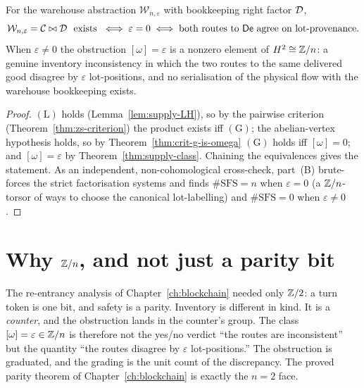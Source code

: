 \begin{corollary}
\label{cor:supply-dichotomy}
For the warehouse abstraction $\mathcal W_{n,\varepsilon}$ with bookkeeping right
factor $\mathcal{D}$,
\[
   \mathcal W_{n,\varepsilon}=\C\bowtie\D \ \text{ exists }
   \iff \varepsilon=0
   \iff \text{both routes to $\mathsf{De}$ agree on lot-provenance.}
\]
When $\varepsilon\ne0$ the obstruction $[\omega]=\varepsilon$ is a nonzero
element of $H^2\cong\mathbb{Z}/n$: a genuine inventory inconsistency in which the two
routes to the same delivered good disagree by $\varepsilon$ lot-positions, and no
serialisation of the physical flow with the warehouse bookkeeping exists.
\end{corollary}

\begin{proof}
$(\mathrm{L})$ holds (Lemma~\ref{lem:supply-LH}), so by the pairwise criterion
(Theorem~\ref{thm:zs-criterion}) the product exists iff $(\mathrm{G})$; the
abelian-vertex hypothesis holds, so by Theorem~\ref{thm:crit-g-is-omega}
$(\mathrm{G})$ holds iff $[\omega]=0$; and $[\omega]=\varepsilon$ by
Theorem~\ref{thm:supply-class}. Chaining the equivalences gives the statement. As
an independent, non-cohomological cross-check, part~(B) brute-forces the strict
factorisation systems and finds $\#\mathrm{SFS}=n$ when $\varepsilon=0$ (a
$\mathbb{Z}/n$-torsor of ways to choose the canonical lot-labelling) and
$\#\mathrm{SFS}=0$ when $\varepsilon\ne0$.
\end{proof}

\section{Why $\mathbb{Z}/n$, and not just a parity bit}
\label{sec:supply-zn}

The re-entrancy analysis of Chapter~\ref{ch:blockchain} needed only $\mathbb{Z}/2$: a
turn token is one bit, and safety is a parity. Inventory is different in kind. It
is a \emph{counter}, and the obstruction lands in the counter's group. The class
$[\omega]=\varepsilon\in\mathbb{Z}/n$ is therefore not the yes/no verdict ``the routes
are inconsistent'' but the quantity ``the routes disagree by $\varepsilon$
lot-positions.'' The obstruction is graduated, and the grading is the unit count
of the discrepancy. The proved parity theorem of Chapter~\ref{ch:blockchain} is
exactly the $n=2$ face.

